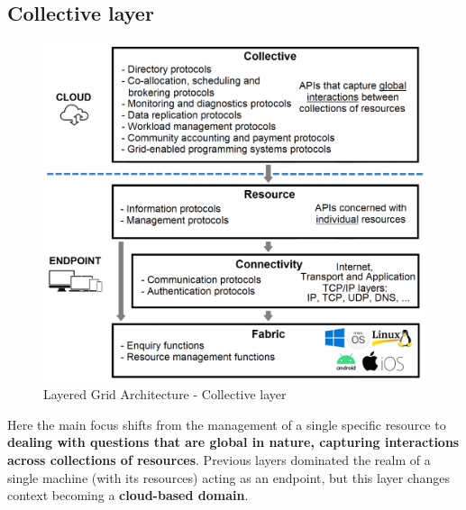 \subsection{Collective layer}
\begin{figure}[!ht]
    \centering
    \includegraphics[scale=0.34]{document/chapters/chapter_2/images/collective_layer.png}
    \caption{Layered Grid Architecture - Collective layer}
    \label{fig:collective_layer}
\end{figure}

\noindent Here the main focus shifts from the management of a single specific resource to \textbf{dealing with questions that are global in nature, capturing interactions across collections of resources}. Previous layers dominated the realm of a single machine (with its resources) acting as an endpoint, but this layer changes context becoming a \textbf{cloud-based domain}.

